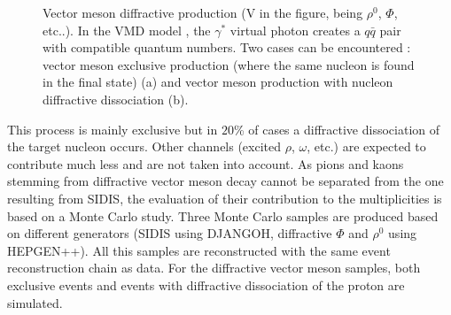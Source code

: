 \begin{figure}[!h]
{}
	\caption{Vector meson diffractive production (V in the figure, being $\rho^0$, $\Phi$, etc..). In the VMD model \cite{VMD}, the $\gamma^*$ virtual photon creates a $q\bar{q}$ pair with compatible quantum numbers. Two cases can be encountered : vector meson exclusive production (where the same nucleon is found in the final state) (a) and vector meson production with nucleon diffractive dissociation (b).}
	\label{pic:DVMprod}
\end{figure}

This process is mainly exclusive but in $20$\% of cases a diffractive dissociation of the target nucleon occurs. Other channels (excited $\rho$, $\omega$, etc.) are expected to contribute much less and are not taken into account. As pions and kaons stemming from diffractive vector meson decay cannot be separated from the one resulting from SIDIS, the evaluation of their contribution to the multiplicities is based on a Monte Carlo study. Three Monte Carlo samples are produced based on different generators (SIDIS using DJANGOH, diffractive $\Phi$ and $\rho^0$ using HEPGEN++). All this samples are reconstructed with the same event reconstruction chain as data. For the diffractive vector meson samples, both exclusive events and events with diffractive dissociation of the proton are simulated.

